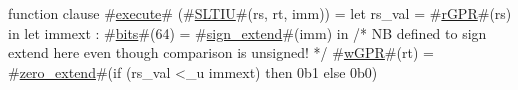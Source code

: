 function clause #\hyperref[zexecute]{execute}# (#\hyperref[zSLTIU]{SLTIU}#(rs, rt, imm)) =
  {
    let rs_val = #\hyperref[zrGPR]{rGPR}#(rs) in
    let immext : #\hyperref[zbits]{bits}#(64) = #\hyperref[zsignzyextend]{sign\_extend}#(imm) in /* NB defined to sign extend here even though comparison is unsigned! */
    #\hyperref[zwGPR]{wGPR}#(rt) = #\hyperref[zzzerozyextend]{zero\_extend}#(if (rs_val <_u immext) then 0b1 else 0b0)
  }
